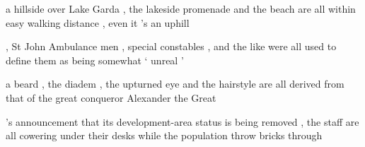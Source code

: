 \documentclass[11pt,a4paper]{article}
\begin{document}
\begin{examples}
\item
\begin{examples}
\item a hillside over Lake Garda , the lakeside promenade and the beach are all within easy walking distance , even it 's an uphill 
\item , St John Ambulance men , special constables , and the like were all used to define them as being somewhat ` unreal ' 
\item a beard , the diadem , the upturned eye and the hairstyle are all derived from that of the great conqueror Alexander the Great 
\item 's announcement that its development-area status is being removed , the staff are all cowering under their desks while the population throw bricks through 
\end{examples}
\end{examples}
\end{document}
